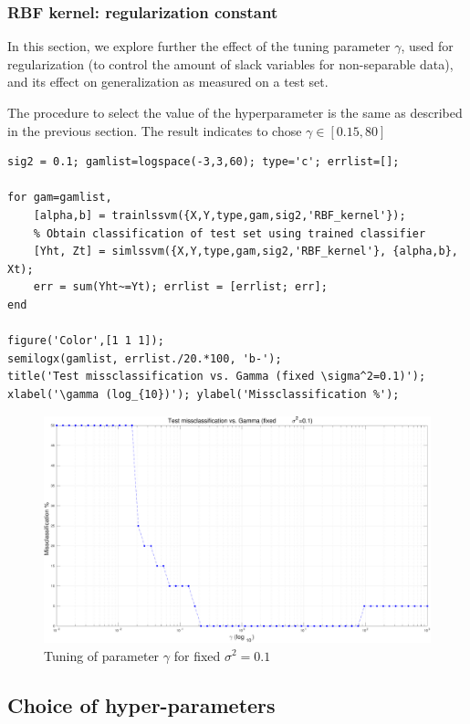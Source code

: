 \documentclass[11pt, a4paper]{article}
\begin{document}
\subsubsection{RBF kernel: regularization constant}

In this section, we explore further the effect of the tuning parameter
$\gamma$, used for regularization (to control the amount of slack
variables for non-separable data), and its effect on generalization as
measured on a test set.

The procedure to select the value of the hyperparameter is the same as
described in the previous section. The result indicates to chose
$\gamma \in [0.15,80]$
\begin{lstlisting}
sig2 = 0.1; gamlist=logspace(-3,3,60); type='c'; errlist=[];

for gam=gamlist,
    [alpha,b] = trainlssvm({X,Y,type,gam,sig2,'RBF_kernel'});
    % Obtain classification of test set using trained classifier
    [Yht, Zt] = simlssvm({X,Y,type,gam,sig2,'RBF_kernel'}, {alpha,b}, Xt);
    err = sum(Yht~=Yt); errlist = [errlist; err];
end

figure('Color',[1 1 1]);
semilogx(gamlist, errlist./20.*100, 'b-');
title('Test missclassification vs. Gamma (fixed \sigma^2=0.1)');
xlabel('\gamma (log_{10})'); ylabel('Missclassification %');
\end{lstlisting}

\begin{figure}[H]
    \centering
    \includegraphics[scale=.40]{rbf_gamma.pdf}
    \caption{Tuning of parameter $\gamma$ for fixed $\sigma^2=0.1$}
    \label{fig:rbf_gamma}
\end{figure}

\subsection{Choice of hyper-parameters}
\end{document}

